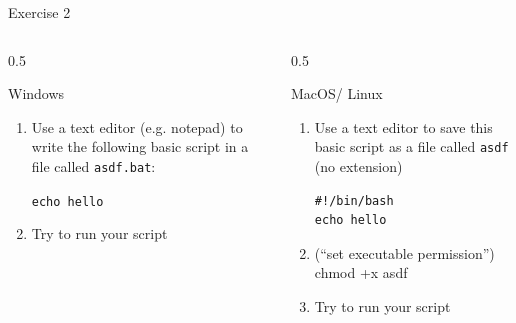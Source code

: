 \documentclass[xcolor={svgnames,x11names,dvipsnames}]{beamer}
\newcommand{\cmd}{}
\begin{document}
\begin{frame}[fragile] {Exercise 2}
\begin{columns}[t]
\begin{column}{0.5\textwidth}
\begin{block}{Windows}
\begin{enumerate} 
\item Use a text editor (e.g. notepad) to write the following basic script in a file called
{\tt asdf.bat}:

\vspace{10pt}
{\tt echo hello}
\item Try to run your script
\end{enumerate}
\end{block}
\end{column}
\begin{column}{0.5\textwidth}
\begin{block}{MacOS/ Linux}
\begin{enumerate} 
\item Use a text editor to save this basic script as a file called {\tt asdf}
(no extension)
\begin{verbatim}
#!/bin/bash
echo hello
\end{verbatim}
\item (``set executable permission'')
\cmd{chmod +x asdf}
\item Try to run your script
\end{enumerate}
\end{block}


\end{column}
\end{columns}
\end{frame}
\end{document}
